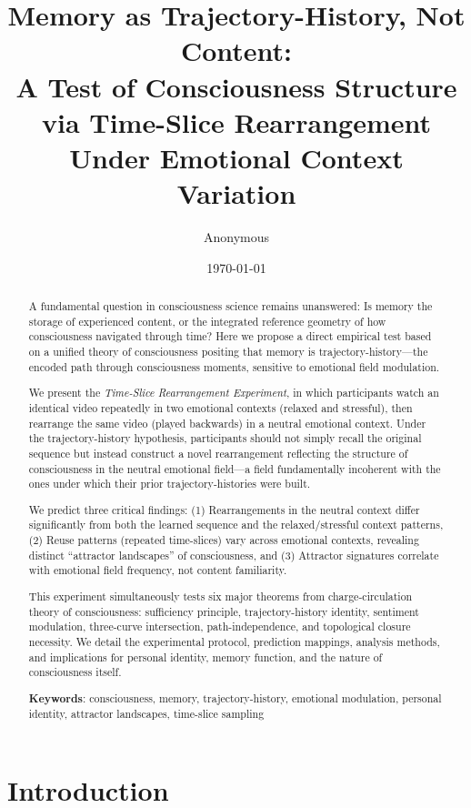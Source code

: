 \documentclass[12pt,a4paper]{article}
\title{Memory as Trajectory-History, Not Content: \\
A Test of Consciousness Structure via Time-Slice Rearrangement Under Emotional Context Variation}
\author{Anonymous}
\date{\today}
\theoremstyle{definition}
\begin{document}
\maketitle

\begin{abstract}

A fundamental question in consciousness science remains unanswered: Is memory the storage of experienced content, or the integrated reference geometry of how consciousness navigated through time? Here we propose a direct empirical test based on a unified theory of consciousness positing that memory is trajectory-history---the encoded path through consciousness moments, sensitive to emotional field modulation.

We present the \textit{Time-Slice Rearrangement Experiment}, in which participants watch an identical video repeatedly in two emotional contexts (relaxed and stressful), then rearrange the same video (played backwards) in a neutral emotional context. Under the trajectory-history hypothesis, participants should not simply recall the original sequence but instead construct a novel rearrangement reflecting the structure of consciousness in the neutral emotional field---a field fundamentally incoherent with the ones under which their prior trajectory-histories were built.

We predict three critical findings: (1) Rearrangements in the neutral context differ significantly from both the learned sequence and the relaxed/stressful context patterns, (2) Reuse patterns (repeated time-slices) vary across emotional contexts, revealing distinct ``attractor landscapes'' of consciousness, and (3) Attractor signatures correlate with emotional field frequency, not content familiarity.

This experiment simultaneously tests six major theorems from charge-circulation theory of consciousness: sufficiency principle, trajectory-history identity, sentiment modulation, three-curve intersection, path-independence, and topological closure necessity. We detail the experimental protocol, prediction mappings, analysis methods, and implications for personal identity, memory function, and the nature of consciousness itself.

\textbf{Keywords}: consciousness, memory, trajectory-history, emotional modulation, personal identity, attractor landscapes, time-slice sampling

\end{abstract}

\section{Introduction}
\end{document}
